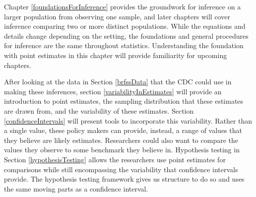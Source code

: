 Chapter \ref {foundationsForInference} provides the groundwork for inference on a larger population from observing one sample, and later chapters will cover inference comparing two or more distinct populations. While the equations and details change depending on the setting, the foundations and general procedures for inference are the same throughout statistics. Understanding the foundation with point estimates in this chapter will provide familiarity for upcoming chapters. 

After looking at the data in Section \ref{brfssData} that the CDC could use in making these inferences, section \ref{variabilityInEstimates} will provide an introduction to point estimates, the sampling distribution that these estimates are drawn from, and the variability of these estimates. Section \ref{confidenceIntervals} will present tools to incorporate this variability. Rather than a single value, these policy makers can provide, instead, a range of values that they believe are likely estimates. Researchers could also want to compare the values they observe to some benchmark they believe in. Hypothesis testing in Section \ref{hypothesisTesting} allows the researchers use point estimates for comparisons while still encompassing the variability that confidence intervals provide. The hypothesis testing framework gives us structure to do so and uses the same moving parts as a confidence interval. 

